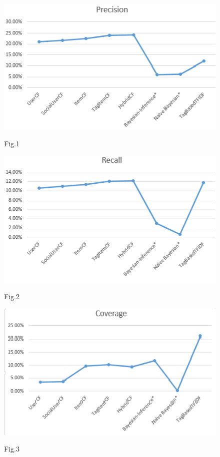 \documentclass{sig-alternate}
\begin{document}
\begin{figure}[h]
\includegraphics[width=\linewidth]{image/Precision}
\begin{center}
Fig.1
\end{center}
\end{figure}

\begin{figure}[h]
\includegraphics[width=\linewidth]{image/Recall}
\begin{center}
Fig.2
\end{center}
\end{figure}

\begin{figure}[h]
\includegraphics[width=\linewidth]{image/Coverage}
\begin{center}
Fig.3
\end{center}
\end{figure}
\end{document}

